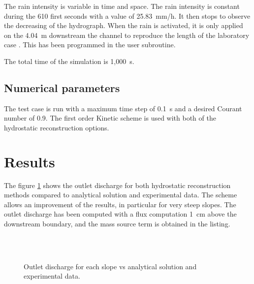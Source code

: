 The rain intensity is variable in time and space.
The rain intensity is constant during the 610 first seconds with a value of
25.83~mm/h. It then stops to observe the decreasing of the hydrograph.
When the rain is activated, it is only applied on the 4.04~m downstream the
channel to reproduce the length of the laboratory case \cite{Kirstetter2015}.
This has been programmed in the  user subroutine. 

The total time of the simulation is 1,000~s.

\subsection{Numerical parameters}

The test case is run with a maximum time step of 0.1~s and a desired Courant
number of 0.9.
The first order Kinetic scheme is used with both of the hydrostatic reconstruction options. 

\section{Results}

The figure \ref{t2d:rain_runoff:fig:result} shows the outlet discharge for both
hydrostatic reconstruction methods compared to analytical solution and experimental data.
The \cite{Chen2017} scheme allows an improvement of the results, in particular
for very steep slopes.
The outlet discharge has been computed with a flux computation 1~cm above the
downstream boundary, and the mass source term is obtained in the  listing.

\begin{figure}[H]
 \centering
 \\
 \\
 \caption{Outlet discharge for each slope vs analytical solution and experimental data.}
 \label{t2d:rain_runoff:fig:result}
\end{figure}




